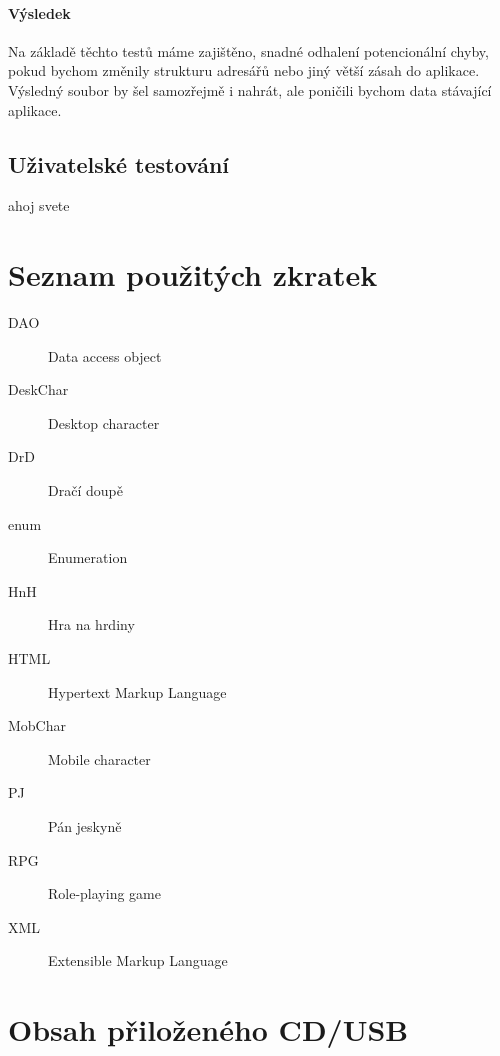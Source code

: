 \documentclass[thesis=B,czech]{resources/FITthesis}[2012/06/26]
\begin{document}
			\subsubsection*{Výsledek}
Na základě těchto testů máme zajištěno, snadné odhalení potencionální chyby, pokud bychom změnily strukturu adresářů nebo jiný větší zásah do aplikace. Výsledný soubor by šel samozřejmě i nahrát, ale poničili bychom data stávající aplikace.

\section{Uživatelské testování}
ahoj svete

\begin{conclusion}
\end{conclusion}




\appendix

\chapter{Seznam použitých zkratek}
\begin{description}
	\item[DAO] Data access object
	\item[DeskChar] Desktop character
	\item[DrD] Dračí doupě
	\item[enum] Enumeration
	\item[HnH] Hra na hrdiny
	\item[HTML] Hypertext Markup Language
	\item[MobChar] Mobile character
	\item[PJ] Pán jeskyně
	\item[RPG] Role-playing game
	\item[XML] Extensible Markup Language
\end{description}

 

\chapter{Obsah přiloženého CD/USB}


\begin{figure}
\end{figure}
\end{document}
